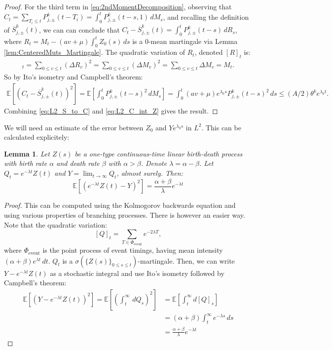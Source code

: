\documentclass{article}
\numberwithin{equation}{section}
\newtheorem{lemma}{Lemma}
\begin{document}
\begin{proof}
For the third term in \eqref{eq:2ndMomentDecomposition}, observing that $C_t=\sum_{T_i\leq t}P_{j,\pm}^{k}(t-T_i)=\int_0^t P_{j,\pm}^k(t-s,1)\,dM_s$, and recalling the definition of $\overline{S}_{j,\pm}^{k}(t)$, we can can conclude that $C_t-\overline{S}_{j,\pm}^{k}(t)=\int_0^t P_{j,\pm}^{k}(t-s)\,dR_s$, where $R_t=M_t-(av+\mu)\int_0^t Z_0(s)\,ds$ is a $0$-mean martingale via Lemma \ref{lem:CenteredMuts_Martingale}. The quadratic variation of $R_t$, denoted $[R]_t$ is:
\begin{align*}
    [R]_t=\sum_{0\leq v\leq t}(\Delta R_v)^2=\sum_{0\leq v\leq t}(\Delta M_v)^2=\sum_{0\leq v\leq t}\Delta M_v=M_t.
\end{align*}
So by Ito's isometry and Campbell's theorem:
\begin{align}
  \mathbb{E}\left[(C_t-\overline{S}_{j,\pm}^{k}(t))^2\right]=\mathbb{E}\left[\int_0^t P_{j,\pm}^{k}(t-s)^2\,dM_s\right]=\int_0^t (av+\mu)e^{\lambda_0 s}P_{j,\pm}^{k}(t-s)^2\,ds\leq (A/2)\theta^k e^{\lambda_0t}\label{eq:L2_C_int_Z}.
\end{align}
Combining \ref{eq:L2_S_to_C} and \ref{eq:L2_C_int_Z} gives the result.
\end{proof}

We will need an estimate of the error between $Z_0$ and $Ye^{\lambda_0 s}$ in $L^2$. This can be calculated explicitely:
\begin{lemma}\label{lem:L2_distance}
    Let $Z(s)$ be a one-type continuous-time linear birth-death process with birth rate $\alpha$ and death rate $\beta$ with $\alpha>\beta$. Denote $\lambda=\alpha-\beta$. Let $Q_t=e^{-\lambda t}Z(t)$ and $Y=\lim_{t\to\infty} Q_t$, almost surely. Then:
    \[\mathbb{E}\left[\left(e^{-\lambda t}Z(t)-Y\right)^2\right]=\frac{\alpha+\beta}{\lambda}e^{-\lambda t}\]
\end{lemma}
\begin{proof}
    This can be computed using the Kolmogorov backwards equation and using various properties of branching processes. There is however an easier way. Note that the quadratic variation:
    \[[Q]_t=\sum_{T\in\Phi_{\text{event}}} e^{-2\lambda T},\]
    where $\Phi_{\text{event}}$ is the point process of event timings, having mean intensity $(\alpha+\beta)e^{\lambda t}\,dt$. $Q_t$ is a $\sigma(\{Z(s)\}_{0\leq s\leq t})$-martingale. Then, we can write $Y-e^{-\lambda t}Z(t)$ as a stochastic integral and use Ito's isometry followed by Campbell's theorem:
    \begin{align*}
        \mathbb{E}\left[\left(Y-e^{-\lambda t}Z(t)\right)^2\right]=\mathbb{E}\left[\left(\int_t^\infty\,dQ_s\right)^2\right]&=\mathbb{E}\left[\int_t^\infty d[Q]_s\right]\\
        &=(\alpha+\beta)\int_t^\infty e^{-\lambda s}\,ds\\
        &=\frac{\alpha+\beta}{\lambda}e^{-\lambda t}
    \end{align*}
\end{proof}
\end{document}
